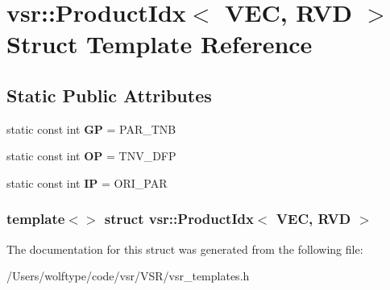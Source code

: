 \hypertarget{structvsr_1_1_product_idx_3_01_v_e_c_00_01_r_v_d_01_4}{\section{vsr\-:\-:Product\-Idx$<$ V\-E\-C, R\-V\-D $>$ Struct Template Reference}
\label{structvsr_1_1_product_idx_3_01_v_e_c_00_01_r_v_d_01_4}
}
\subsection*{Static Public Attributes}
\begin{DoxyCompactItemize}
\item 
\hypertarget{structvsr_1_1_product_idx_3_01_v_e_c_00_01_r_v_d_01_4_a3a690d5a81d39f134db0948018216528}{static const int {\bfseries G\-P} = P\-A\-R\-\_\-\-T\-N\-B}\label{structvsr_1_1_product_idx_3_01_v_e_c_00_01_r_v_d_01_4_a3a690d5a81d39f134db0948018216528}

\item 
\hypertarget{structvsr_1_1_product_idx_3_01_v_e_c_00_01_r_v_d_01_4_aeb6f0c0b90e3a588becf7c72de3319c6}{static const int {\bfseries O\-P} = T\-N\-V\-\_\-\-D\-F\-P}\label{structvsr_1_1_product_idx_3_01_v_e_c_00_01_r_v_d_01_4_aeb6f0c0b90e3a588becf7c72de3319c6}

\item 
\hypertarget{structvsr_1_1_product_idx_3_01_v_e_c_00_01_r_v_d_01_4_aac722b5452ab298796b19a694aeb660f}{static const int {\bfseries I\-P} = O\-R\-I\-\_\-\-P\-A\-R}\label{structvsr_1_1_product_idx_3_01_v_e_c_00_01_r_v_d_01_4_aac722b5452ab298796b19a694aeb660f}

\end{DoxyCompactItemize}
\subsubsection*{template$<$$>$ struct vsr\-::\-Product\-Idx$<$ V\-E\-C, R\-V\-D $>$}



The documentation for this struct was generated from the following file\-:\begin{DoxyCompactItemize}
\item 
/\-Users/wolftype/code/vsr/\-V\-S\-R/vsr\-\_\-templates.\-h\end{DoxyCompactItemize}
